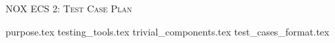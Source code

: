 \documentclass[hidelinks]{article}
\begin{document}
\begin{titlepage}
    \centering
    {\scshape\LARGE NOX ECS 2: Test Case Plan \par}
    \vfill
    {\large \date{}\par}
\end{titlepage}

\tableofcontents
\pagebreak


{purpose.tex}
{testing_tools.tex}
{trivial_components.tex}
{test_cases_format.tex}
\end{document}
